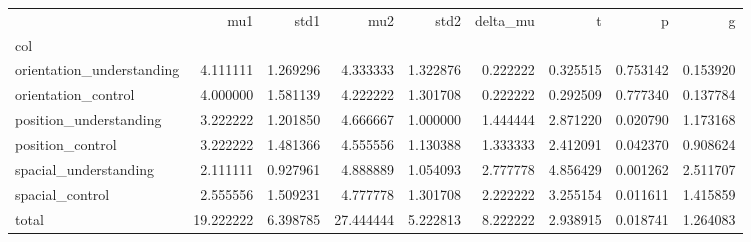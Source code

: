 \begin{tabular}{lrrrrrrrr}
\toprule
{} &        mu1 &      std1 &        mu2 &      std2 &  delta\_mu &         t &         p &         g \\
col                       &            &           &            &           &           &           &           &           \\
\midrule
orientation\_understanding &   4.111111 &  1.269296 &   4.333333 &  1.322876 &  0.222222 &  0.325515 &  0.753142 &  0.153920 \\
orientation\_control       &   4.000000 &  1.581139 &   4.222222 &  1.301708 &  0.222222 &  0.292509 &  0.777340 &  0.137784 \\
position\_understanding    &   3.222222 &  1.201850 &   4.666667 &  1.000000 &  1.444444 &  2.871220 &  0.020790 &  1.173168 \\
position\_control          &   3.222222 &  1.481366 &   4.555556 &  1.130388 &  1.333333 &  2.412091 &  0.042370 &  0.908624 \\
spacial\_understanding     &   2.111111 &  0.927961 &   4.888889 &  1.054093 &  2.777778 &  4.856429 &  0.001262 &  2.511707 \\
spacial\_control           &   2.555556 &  1.509231 &   4.777778 &  1.301708 &  2.222222 &  3.255154 &  0.011611 &  1.415859 \\
total                     &  19.222222 &  6.398785 &  27.444444 &  5.222813 &  8.222222 &  2.938915 &  0.018741 &  1.264083 \\
\bottomrule
\end{tabular}
